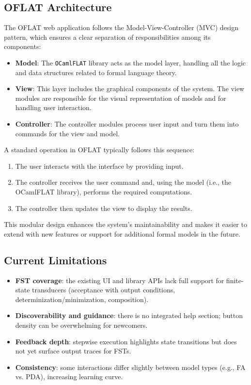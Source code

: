 \subsection{OFLAT Architecture}

The OFLAT web application follows the Model-View-Controller (MVC) design pattern, 
which ensures a clear separation of responsibilities among its components:

\begin{itemize}
    \item \textbf{Model}: The \texttt{OCamlFLAT} library acts as the model layer, 
    handling all the logic and data structures related to formal language theory.
    \item \textbf{View}: This layer includes the graphical components of the system.
    The view modules are responsible for the visual representation of models and for handling user interaction.
    \item \textbf{Controller}: The controller modules process user input and turn them into commands for the view and model.
\end{itemize}
A standard operation in OFLAT typically follows this sequence:
\begin{enumerate}
    \item The user interacts with the interface by providing input.
    \item The controller receives the user command and, using the model (i.e., the OCamlFLAT library), performs the required computations.
    \item The controller then updates the view to display the results.
\end{enumerate}

This modular design enhances the system's maintainability and makes it easier to extend with new features or support for additional formal models in the future.

\subsection{Current Limitations}
\begin{itemize}
    \item \textbf{FST coverage}: the existing UI and library APIs lack full support for finite-state transducers (acceptance with output conditions, determinization/minimization, composition).
    \item \textbf{Discoverability and guidance}: there is no integrated help section; button density can be overwhelming for newcomers.
    \item \textbf{Feedback depth}: stepwise execution highlights state transitions but does not yet surface output traces for FSTs.
    \item \textbf{Consistency}: some interactions differ slightly between model types (e.g., FA vs. PDA), increasing learning curve.
\end{itemize}

